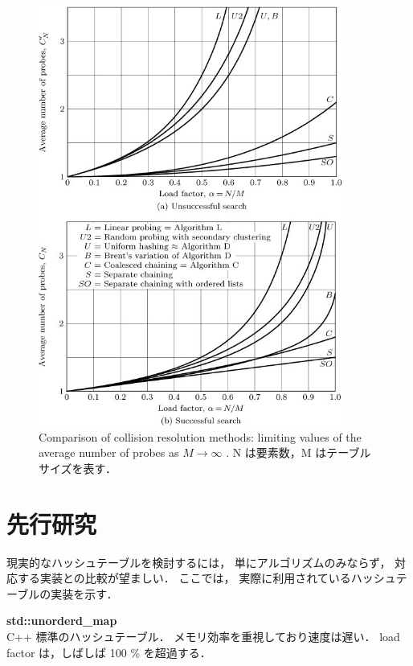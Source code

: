 \begin{figure} %
  \centering
  \includegraphics[width=10cm]{./fig/taocp_v3_fig44.png}
  \caption{
    Comparison of collision resolution methods: limiting values of the average number of probes as $M \rightarrow \infty$ \citep{knuth1998}.
    N は要素数，M はテーブルサイズを表す．
  }
  \label{fig_taocp_v3_fig44}
\end{figure}


\section{先行研究}
現実的なハッシュテーブルを検討するには，
単にアルゴリズムのみならず，
対応する実装との比較が望ましい．
ここでは，
実際に利用されているハッシュテーブルの実装を示す．
\leavevmode \newline

{\bf std::unorderd\_map}
\samepage \\ \indent
C++ 標準のハッシュテーブル．
メモリ効率を重視しており速度は遅い．
load factor は，しばしば 100 \% を超過する．

